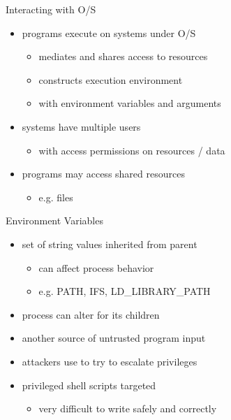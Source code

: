\documentclass{beamer}
\begin{document}
\begin{frame}{Interacting with O/S}
  \begin{itemize}
  \item programs execute on systems under O/S
    \begin{itemize}  
    \item mediates and shares access to resources    
    \item constructs execution environment
    \item with environment variables and arguments
    \end{itemize}
  \item systems have multiple users
    \begin{itemize}
    \item with access permissions on resources / data
    \end{itemize}
  \item programs may access shared resources
    \begin{itemize}
    \item e.g. files
    \end{itemize}
  \end{itemize}
\end{frame}


\begin{frame}{Environment Variables}
  \begin{itemize}
  \item set of string values inherited from parent
    \begin{itemize}  
    \item can affect process behavior
    \item e.g. PATH, IFS, LD\_LIBRARY\_PATH
    \end{itemize}
  \item process can alter for its children
  \item another source of untrusted program input
  \item attackers use to try to escalate privileges
  \item privileged shell scripts targeted
    \begin{itemize}  
    \item very difficult to write safely and correctly
    \end{itemize}
  \end{itemize}
\end{frame}
\end{document}
